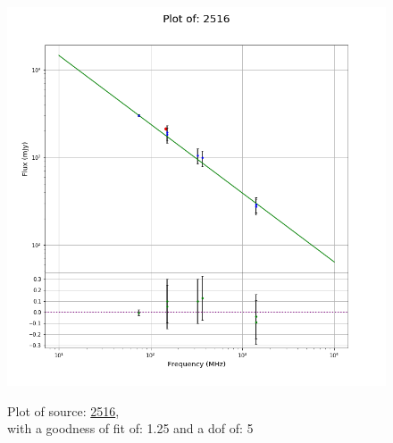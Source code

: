 \documentclass{article}
\begin{document}
\begin{figure}[H]
\begin{minipage}{0.5\textwidth}
        \includegraphics[scale = 0.35]{KmeulenTrap4P23_1hr/1hr2516.png}
        \captionsetup{labelformat=empty}
        \caption{Plot of source: \href{http://banana.transientskp.org/r4/vlo_KmeulenTrap4P23/runningcatalog/2516}{2516},\\with a goodness of fit of: 1.25 and a dof of: 5}
    \addtocounter{figure}{-1}
    \label{KmeulenTrap4P23:1hr:2516:plot}
    \end{minipage}
\end{figure}
\end{document}

